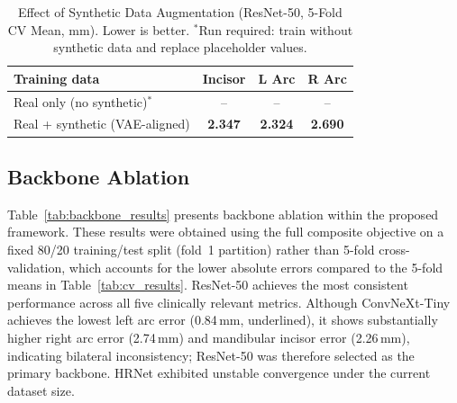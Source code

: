 \documentclass[conference]{IEEEtran}
\begin{document}
\begin{table}[htbp]
\caption{Effect of Synthetic Data Augmentation (ResNet-50, 5-Fold CV Mean, mm). Lower is
better. $^*$Run required: train without synthetic data and replace placeholder values.}
\begin{center}
\begin{tabular}{|l|c|c|c|}
\hline
\textbf{Training data} & \textbf{Incisor} & \textbf{L Arc} & \textbf{R Arc} \\
\hline
Real only (no synthetic)$^*$   & -- & -- & -- \\
Real + synthetic (VAE-aligned) & \textbf{2.347} & \textbf{2.324} & \textbf{2.690} \\
\hline
\end{tabular}
\label{tab:synthetic}
\end{center}
\end{table}

\subsection{Backbone Ablation}

Table~\ref{tab:backbone_results} presents backbone ablation within the proposed framework.
These results were obtained using the full composite objective on a fixed 80/20 training/test
split (fold~1 partition) rather than 5-fold cross-validation, which accounts for the lower
absolute errors compared to the 5-fold means in Table~\ref{tab:cv_results}. ResNet-50 achieves
the most consistent performance across all five clinically relevant metrics. Although
ConvNeXt-Tiny achieves the lowest left arc error (0.84\,mm, underlined), it shows
substantially higher right arc error (2.74\,mm) and mandibular incisor error (2.26\,mm),
indicating bilateral inconsistency; ResNet-50 was therefore selected as the primary backbone.
HRNet exhibited unstable convergence under the current dataset size.
\end{document}
